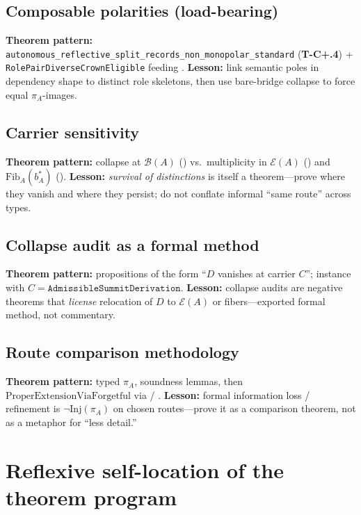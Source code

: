 \documentclass[11pt]{article}
\begin{document}
\subsection{Composable polarities (load-bearing)}\label{sec:contributions-polarities}
\textbf{Theorem pattern:} \texttt{autonomous\_reflective\_split\_records\_non\_monopolar\_standard} (\textbf{T-C+.4}) + \texttt{RolePairDiverseCrownEligible} feeding . \textbf{Lesson:} link semantic poles in dependency shape to distinct role skeletons, then use bare-bridge collapse to force equal $\pi_A$-images.

\subsection{Carrier sensitivity}\label{sec:contributions-carrier}
\textbf{Theorem pattern:} collapse at $\mathcal{B}(A)$ () vs.\ multiplicity in $\mathcal{E}(A)$ () and $\mathrm{Fib}_A(b^\ast_A)$ (). \textbf{Lesson:} \emph{survival of distinctions} is itself a theorem---prove where they vanish and where they persist; do not conflate informal ``same route'' across types.

\subsection{Collapse audit as a formal method}\label{sec:contributions-audit}
\textbf{Theorem pattern:} propositions of the form ``$D$ vanishes at carrier $C$''; instance  with $C = \texttt{AdmissibleSummitDerivation}$. \textbf{Lesson:} collapse audits are negative theorems that \emph{license} relocation of $D$ to $\mathcal{E}(A)$ or fibers---exported formal method, not commentary.

\subsection{Route comparison methodology}\label{sec:contributions-route}
\textbf{Theorem pattern:} typed $\pi_A$, soundness lemmas, then $\mathrm{ProperExtensionViaForgetful}$ via  / . \textbf{Lesson:} formal information loss / refinement is $\neg\mathrm{Inj}(\pi_A)$ on chosen routes---prove it as a comparison theorem, not as a metaphor for ``less detail.''

\section{Reflexive self-location of the theorem program}\label{sec:reflexive-location}
\end{document}

